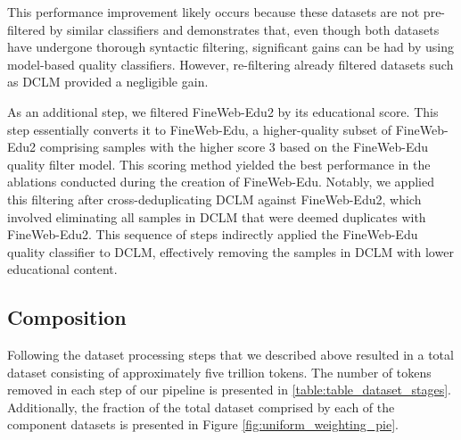 \documentclass[conference]{IEEEtran}
\begin{document}
This performance improvement likely occurs because these datasets are not pre-filtered by similar classifiers and demonstrates that, even though both datasets have undergone thorough syntactic filtering, significant gains can be had by using model-based quality classifiers. However, re-filtering already filtered datasets such as DCLM provided a negligible gain.

As an additional step, we filtered FineWeb-Edu2 by its educational score. This step essentially converts it to FineWeb-Edu, a higher-quality subset of FineWeb-Edu2 comprising samples with the higher score 3 based on the FineWeb-Edu quality filter model. This scoring method yielded the best performance in the ablations conducted during the creation of FineWeb-Edu. Notably, we applied this filtering after cross-deduplicating DCLM against FineWeb-Edu2, which involved eliminating all samples in DCLM that were deemed duplicates with FineWeb-Edu2. This sequence of steps indirectly applied the FineWeb-Edu quality classifier to DCLM, effectively removing the samples in DCLM with lower educational content.



\subsection{Composition}

Following the dataset processing steps that we described above resulted in a total dataset consisting of approximately five trillion tokens. The number of tokens removed in each step of our pipeline is presented in \cref{table:table_dataset_stages}. Additionally, the fraction of the total dataset comprised by each of the component datasets is presented in Figure \ref{fig:uniform_weighting_pie}.
\end{document}
